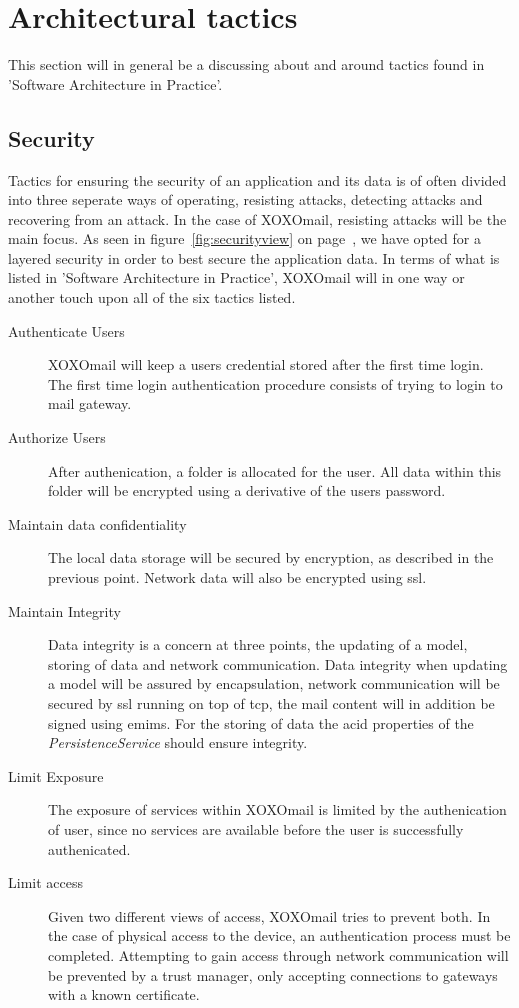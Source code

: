 \section{Architectural tactics}
	This section will in general be a discussing about and around tactics found in 'Software Architecture in Practice'\cite{bib:archi}. 
	\subsection{Security}
		Tactics for ensuring the security of an application and its data is of often divided into three seperate ways of operating, resisting attacks, detecting attacks and recovering from an attack. 
		In the case of XOXOmail, resisting attacks will be the main focus. As seen in figure~\ref{fig:securityview} on page~\pageref{fig:securityview}, we have opted for a layered security in order to best secure the application data. In terms of what is listed in 'Software Architecture in Practice'\cite[p. 119]{bib:archi}, XOXOmail will in one way or another touch upon all of the six tactics listed. 
		\begin{description}
			\item[Authenticate Users] XOXOmail will keep a users credential stored after the first time login. The first time login authentication procedure consists of trying to login to mail gateway.
			\item[Authorize Users] After authenication, a folder is allocated for the user. All data within this folder will be encrypted using a derivative of the users password. 
			\item[Maintain data confidentiality] The local data storage will be secured by encryption, as described in the previous point. Network data will also be encrypted using \gls{ssl}. 
			\item[Maintain Integrity] Data integrity is a concern at three points, the updating of a model, storing of data and network communication. Data integrity when updating a model will be assured by encapsulation, network communication will be secured by \gls{ssl} running on top of \gls{tcp}, the mail content will in addition be signed using \gls{emims}. For the storing of data the \gls{acid} properties of the \textit{PersistenceService} should ensure integrity. 
			\item[Limit Exposure] The exposure of services within XOXOmail is limited by the authenication of user, since no services are available before the user is successfully authenicated.
			\item[Limit access] Given two different views of access, XOXOmail tries to prevent both. In the case of physical access to the device, an authentication process must be completed. Attempting to gain access through network communication will be prevented by a trust manager, only accepting connections to gateways with a known certificate. 
		\end{description}
		
